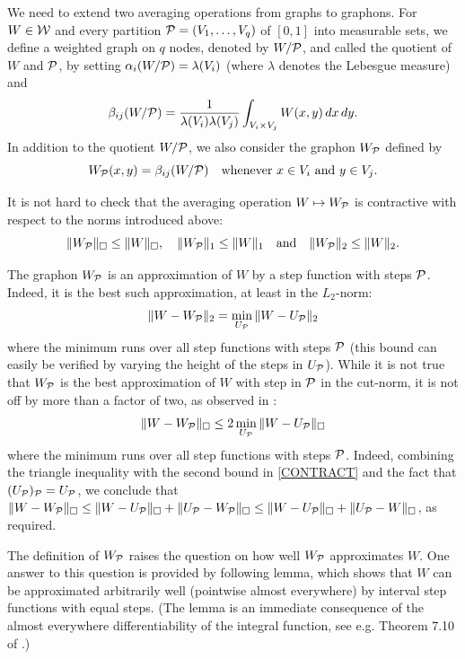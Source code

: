 \documentclass[12pt]{article}
\numberwithin{equation}{section}
\def\PP{{\cal P}}\def\QQ{{\cal Q}}\def\RR{{\cal R}}
\begin{document}
We need to extend two averaging operations from graphs to graphons.
For $W\in{\cal W}$ and every partition $\PP=(V_1,\dots,V_q)$ of $[0,1]$
into measurable sets, we define a weighted graph on $q$ nodes,
denoted by $W/\PP$, and called the quotient of $W$ and $\PP$,
by
setting $\alpha_i(W/\PP)=\lambda(V_i)$ (where $\lambda$ denotes the
Lebesgue measure) and
\begin{equation}\label{U-FACT}
\beta_{ij}(W/\PP)=\frac{1}{\lambda(V_i)\lambda(V_j)} \int_{V_i\times V_j}
W(x,y)\,dx\,dy.
\end{equation}
In addition to the quotient  $W/\PP$, we also consider the graphon
$W_\PP$ defined by
\begin{equation}\label{U-AVER}
W_\PP(x,y)= \beta_{ij}(W/\PP) \quad\text{whenever $x\in V_i$ and
$y\in V_j$.}
\end{equation}

It is not hard to check that the averaging operation $W\mapsto W_\PP$
is contractive with respect to the  norms introduced above:
\begin{equation}
\label{CONTRACT} \|W_\PP\|_\square\le \|W\|_\square, \quad
\|W_\PP\|_1\le \|W\|_1 \quad\text{and}\quad \|W_\PP\|_2\le\|W\|_2.
\end{equation}

The graphon $W_\PP$ is an approximation of $W$ by a step function with
steps $\PP$.  Indeed, it is the best such approximation, at least in
the $L_2$-norm:
\begin{equation}
\label{UP-Opt} \|W-W_\PP\|_2=\min_{U_\PP}\|W-U_\PP\|_2
\end{equation}
where the minimum runs over all step functions with steps $\PP$ (this
bound can easily be verified by varying the height of the steps in
$U_\PP$). While it is not true that $W_\PP$ is the best approximation
of $W$ with step in $\PP$ in the cut-norm, it is not off by more than
a factor of two, as observed in \cite{AFKK}:
\begin{equation}
\label{WP-2Opt} \|W-W_\PP\|_\square\leq 2
\min_{U_\PP}\|W-U_\PP\|_\square
\end{equation}
where the minimum runs over all step functions with steps $\PP$.
Indeed, combining the triangle inequality with the second bound in
\eqref{CONTRACT} and the fact that $(U_\PP)_\PP=U_\PP$, we conclude
that $\|W-W_\PP\|_\square\leq \|W-U_\PP\|_\square +
\|U_\PP-W_\PP\|_\square \leq \|W-U_\PP\|_\square +
\|U_\PP-W\|_\square$, as required.

The definition of $W_\PP$ raises the question on how well $W_\PP$
approximates $W$. One answer to this question is provided by
following lemma, which shows that $W$ can be approximated arbitrarily
well (pointwise almost everywhere) by interval step functions
with equal steps. (The lemma is an immediate consequence of the
almost everywhere differentiability of the integral function, see
e.g. Theorem 7.10 of \cite{Rud}.)
\end{document}
